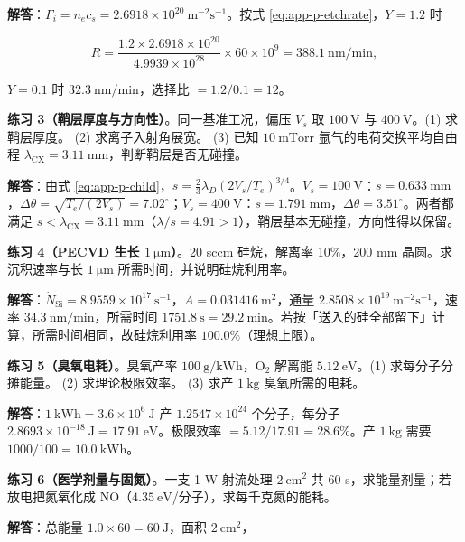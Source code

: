 \textbf{解答}：$\Gamma_i=n_ec_s=2.6918\times10^{20}\ \mathrm{m^{-2}s^{-1}}$。按式 \eqref{eq:app-p-etchrate}，$Y=1.2$ 时

\begin{equation}
  R = \frac{1.2\times2.6918\times10^{20}}{4.9939\times10^{28}} \times60\times10^{9} = 388.1\ \mathrm{nm/min},
  \label{eq:app-p-ex2a}
\end{equation}

$Y=0.1$ 时 $32.3\ \mathrm{nm/min}$，选择比 $=1.2/0.1 = 12$。

\textbf{练习 3（鞘层厚度与方向性）}。同一基准工况，偏压 $V_s$ 取 $100\ \mathrm{V}$ 与 $400\ \mathrm{V}$。(1) 求鞘层厚度。
(2) 求离子入射角展宽。
(3) 已知 $10\ \mathrm{mTorr}$ 氩气的电荷交换平均自由程 $\lambda_{\mathrm{CX}}=3.11\ \mathrm{mm}$，判断鞘层是否无碰撞。

\textbf{解答}：由式 \eqref{eq:app-p-child}，$s = \frac23\lambda_D(2V_s/T_e)^{3/4}$。$V_s=100\ \mathrm{V}$：$s=0.633\ \mathrm{mm}$，$\Delta\theta=\sqrt{T_e/(2V_s)}=7.02^\circ$；$V_s=400\ \mathrm{V}$：$s=1.791\ \mathrm{mm}$，$\Delta\theta=3.51^\circ$。两者都满足 $s<\lambda_{\mathrm{CX}}=3.11\ \mathrm{mm}$（$\lambda/s=4.91>1$），鞘层基本无碰撞，方向性得以保留。

\textbf{练习 4（PECVD 生长 $1\ \mathrm{\mu m}$）}。20 sccm 硅烷，解离率 10\%，200 mm 晶圆。求沉积速率与长 $1\ \mathrm{\mu m}$ 所需时间，并说明硅烷利用率。

\textbf{解答}：$\dot N_{\mathrm{Si}}=8.9559\times10^{17}\ \mathrm{s^{-1}}$，$A=0.031416\ \mathrm{m^2}$，通量 $2.8508\times10^{19}\ \mathrm{m^{-2}s^{-1}}$，速率 $34.3\ \mathrm{nm/min}$，所需时间 $1751.8\ \mathrm{s}=29.2\ \mathrm{min}$。若按「送入的硅全部留下」计算，所需时间相同，故硅烷利用率 $100.0\%$（理想上限）。

\textbf{练习 5（臭氧电耗）}。臭氧产率 $100\ \mathrm{g/kWh}$，$\mathrm{O_2}$ 解离能 $5.12\ \mathrm{eV}$。(1) 求每分子分摊能量。
(2) 求理论极限效率。
(3) 求产 $1\ \mathrm{kg}$ 臭氧所需的电耗。

\textbf{解答}：$1\ \mathrm{kWh}=3.6\times10^{6}\ \mathrm{J}$ 产 $1.2547\times10^{24}$ 个分子，每分子 $2.8693\times10^{-18}\ \mathrm{J}=17.91\ \mathrm{eV}$。极限效率 $=5.12/17.91=28.6\%$。产 $1\ \mathrm{kg}$ 需要 $1000/100 = 10.0\ \mathrm{kWh}$。

\textbf{练习 6（医学剂量与固氮）}。一支 1 W 射流处理 $2\ \mathrm{cm^2}$ 共 60 s，求能量剂量；若放电把氮氧化成 NO（$4.35\ \mathrm{eV}$/分子），求每千克氮的能耗。

\textbf{解答}：总能量 $1.0\times60 = 60\ \mathrm{J}$，面积 $2\ \mathrm{cm^2}$，

